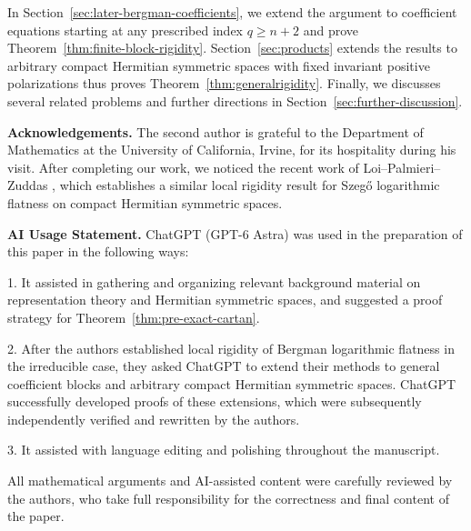 \documentclass[11pt,reqno]{amsart}
\theoremstyle{corollary}
\theoremstyle{conjecture}
\theoremstyle{assumption}
\theoremstyle{proposition}
\theoremstyle{remark}
\numberwithin{equation}{section}
\begin{document}
In Section~\ref{sec:later-bergman-coefficients}, we extend the argument to coefficient equations starting at any prescribed index $q\geq n+2$ and prove Theorem~\ref{thm:finite-block-rigidity}. Section~\ref{sec:products} extends the results to arbitrary compact Hermitian symmetric spaces with fixed invariant positive polarizations thus proves Theorem~\ref{thm:generalrigidity}. Finally, we discusses several related problems and further directions in Section~\ref{sec:further-discussion}.

\medskip
\noindent\textbf{Acknowledgements.} The second author is grateful to the Department of Mathematics at the University of California, Irvine, for its hospitality during his visit. After completing our work, we noticed the recent work of Loi--Palmieri--Zuddas \cite{LoiPalmieriZuddas2026}, which establishes a similar local rigidity result for Szegő logarithmic flatness on compact Hermitian symmetric spaces. 

\medskip
\noindent\textbf{AI Usage Statement.} ChatGPT (GPT-6 Astra) was used in the preparation of this paper in the following ways:

1. It assisted in gathering and organizing relevant background material on representation theory and Hermitian symmetric spaces, and suggested a proof strategy for Theorem~\ref{thm:pre-exact-cartan}.

2. After the authors established local rigidity of Bergman logarithmic flatness in the irreducible case, they asked ChatGPT to extend their methods to general coefficient blocks and arbitrary compact Hermitian symmetric spaces. ChatGPT successfully developed proofs of these extensions, which were subsequently independently verified and rewritten by the authors.

3. It assisted with language editing and polishing throughout the manuscript.

All mathematical arguments and AI-assisted content were carefully reviewed by the authors, who take full responsibility for the correctness and final content of the paper.
\end{document}
